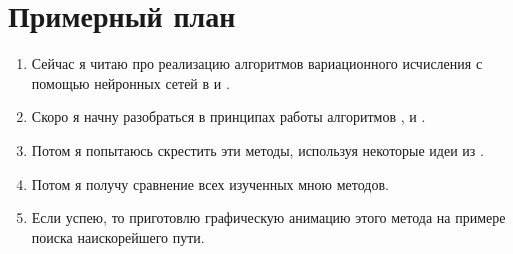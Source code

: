 \documentclass[14pt,a4paper]{article}
\begin{document}
\section{Примерный план}

\begin{enumerate}
\item Сейчас я читаю про реализацию алгоритмов вариационного исчисления с помощью нейронных сетей в \cite{nnarticle} и \cite{dissertation}.
\item Скоро я начну разобраться в принципах работы  алгоритмов \cite{whale}, \cite{graywolf} и \cite{moth}. 
\item Потом я попытаюсь скрестить эти методы, используя некоторые идеи из \cite{whale2}.
\item Потом я получу сравнение всех изученных мною методов.
\item Если успею, то приготовлю графическую анимацию этого метода на примере поиска наискорейшего пути.
\end{enumerate}
\end{document}
